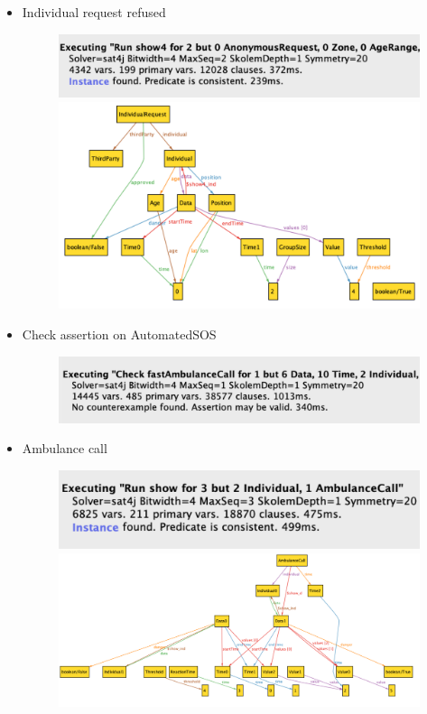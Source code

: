 \documentclass{article}
\begin{document}
\begin{legal}
\begin{itemize}
			\item Individual request refused
			\begin{figure}[H]
		  				\includegraphics[width=\linewidth]{./images/alloy/individual-request-false-Run.png}
		  				\includegraphics[width=\linewidth]{./images/alloy/individual-request-false-World.png}
			\end{figure}
			\newpage
			\item Check assertion on AutomatedSOS
			\begin{figure}[H]
		  				\includegraphics[width=\linewidth]{./images/alloy/automatedSOS-Assert.png}
			\end{figure}
			\item Ambulance call
			\begin{figure}[H]
		  				\includegraphics[width=\linewidth]{./images/alloy/automatedSOS-Run.png}
		  				\includegraphics[width=\linewidth]{./images/alloy/automatedSOS-World.png}

\end{figure}
\end{itemize}
\end{legal}
\end{document}

